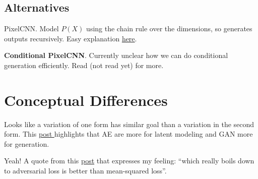 \documentclass{article}
\begin{document}
\subsection{Alternatives}

PixelCNN. Model $P(X)$ using the chain rule over the dimensions, so generates outputs recursively. Easy explanation \href{https://youtu.be/FeJT8ejgsL0?t=763}{here}.

\textbf{Conditional PixelCNN}. Currently unclear how we can do conditional generation efficiently. Read \cite{oord_conditional_2016} (not read yet) for more.



\section{Conceptual Differences}


Looks like a variation of one form has similar goal than a variation in the second form.
This \href{https://www.reddit.com/r/MachineLearning/comments/4r3pjy/variational_autoencoders_vae_vs_generative/}{post }  highlights that AE are more for latent modeling and GAN more for generation.

Yeah! A quote from this  \href{https://www.reddit.com/r/MachineLearning/comments/4r3pjy/variational_autoencoders_vae_vs_generative/}{post} that expresses my feeling: ``which really boils down to adversarial loss is better than mean-squared loss''.




\end{document}
